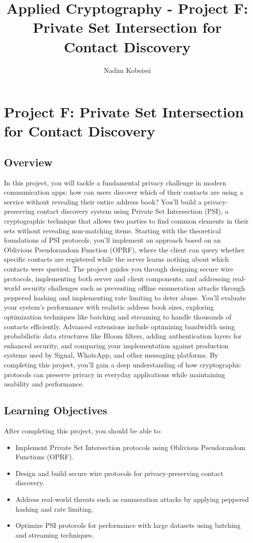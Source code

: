 \documentclass[10pt,a4paper,american]{exam}
\title{Applied Cryptography - Project F: Private Set Intersection for Contact Discovery}
\author{Nadim Kobeissi}
\begin{document}
\classhandoutheader
\section*{Project F: Private Set Intersection for Contact Discovery}

\subsection*{Overview}
In this project, you will tackle a fundamental privacy challenge in modern communication apps: how can users discover which of their contacts are using a service without revealing their entire address book? You'll build a privacy-preserving contact discovery system using Private Set Intersection (PSI), a cryptographic technique that allows two parties to find common elements in their sets without revealing non-matching items. Starting with the theoretical foundations of PSI protocols, you'll implement an approach based on an Oblivious Pseudorandom Function (OPRF), where the client can query whether specific contacts are registered while the server learns nothing about which contacts were queried. The project guides you through designing secure wire protocols, implementing both server and client components, and addressing real-world security challenges such as preventing offline enumeration attacks through peppered hashing and implementing rate limiting to deter abuse. You'll evaluate your system's performance with realistic address book sizes, exploring optimization techniques like batching and streaming to handle thousands of contacts efficiently. Advanced extensions include optimizing bandwidth using probabilistic data structures like Bloom filters, adding authentication layers for enhanced security, and comparing your implementation against production systems used by Signal, WhatsApp, and other messaging platforms. By completing this project, you'll gain a deep understanding of how cryptographic protocols can preserve privacy in everyday applications while maintaining usability and performance.

\subsection*{Learning Objectives}
After completing this project, you should be able to:
\begin{itemize}
	\item Implement Private Set Intersection protocols using Oblivious Pseudorandom Functions (OPRF).
	\item Design and build secure wire protocols for privacy-preserving contact discovery.
	\item Address real-world threats such as enumeration attacks by applying peppered hashing and rate limiting.
	\item Optimize PSI protocols for performance with large datasets using batching and streaming techniques.
\end{itemize}
\end{document}
